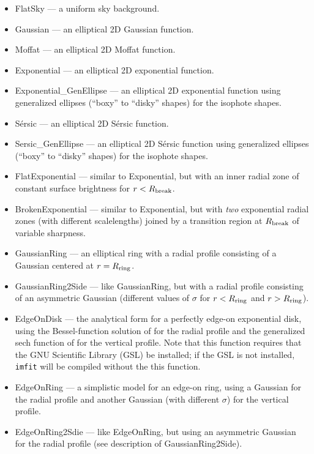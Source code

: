 \documentclass[10pt]{article}
\newcommand{\imfit}{\texttt{imfit}}
\begin{document}
\begin{itemize}
\item FlatSky --- a uniform sky background.
\item Gaussian --- an elliptical 2D Gaussian function.
\item Moffat --- an elliptical 2D Moffat function.
\item Exponential --- an elliptical 2D exponential function.
\item Exponential\_GenEllipse --- an elliptical 2D exponential function using
generalized ellipses (``boxy'' to ``disky'' shapes) for the isophote shapes.
\item S\'ersic --- an elliptical 2D S\'ersic function.
\item Sersic\_GenEllipse --- an elliptical 2D S\'ersic function using
generalized ellipses (``boxy'' to ``disky'' shapes) for the isophote shapes.
\item FlatExponential --- similar to Exponential, but with an inner radial zone
of constant surface brightness for $r < R_{\rm break}$.
\item BrokenExponential --- similar to Exponential, but with \textit{two}
exponential radial zones (with different scalelengths) joined by a transition region
at $R_{\rm break}$ of variable sharpness.
\item GaussianRing --- an elliptical ring with a radial profile
consisting of a Gaussian centered at $r = R_{\rm ring}$.
\item GaussianRing2Side --- like GaussianRing, but with a radial profile
consisting of an asymmetric Gaussian (different values of $\sigma$ for
$r < R_{\rm ring}$ and $r > R_{\rm ring}$).
\item EdgeOnDisk --- the analytical form for a perfectly edge-on exponential
disk, using the Bessel-function solution of \citet{vdk81} for 
the radial profile and the generalized sech function of \citet{vdk88} 
for the vertical profile. Note that this function requires that the GNU
Scientific Library (GSL) be installed; if the GSL is not installed, \imfit{}
will be compiled without the this function.
\item EdgeOnRing --- a simplistic model for an edge-on ring, using a
Gaussian for the radial profile and another Gaussian (with
different $\sigma$) for the vertical profile.
\item EdgeOnRing2Sdie --- like EdgeOnRing, but using an
asymmetric Gaussian for the radial profile (see description of GaussianRing2Side).


\end{itemize}
\end{document}
